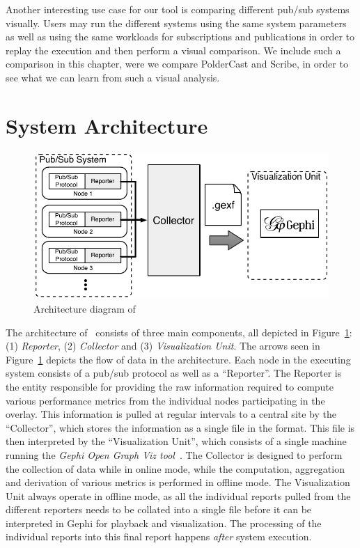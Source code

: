 Another interesting use case for our tool is comparing different pub/sub
systems visually. Users may run the different systems using the same
system parameters as well as using the same workloads for subscriptions
and publications in order to replay the execution and then perform a
visual comparison. We include such a comparison in this chapter, were we
compare PolderCast and Scribe, in order to see what we can learn from
such a visual analysis.

\section{System Architecture}
\label{sec:arch}

\begin{figure}[h]
\centering
\includegraphics[width=\linewidth]{figures/arch}
\caption{Architecture diagram of \demo}
\label{fig:arch}
\end{figure}

The architecture of \demo~consists of three main components, all
depicted in Figure~\ref{fig:arch}: (1) \emph{Reporter}, (2)
\emph{Collector} and (3) \emph{Visualization Unit}.  The arrows seen in
Figure~\ref{fig:arch} depicts the flow of data in the architecture.
Each node in the executing system consists of a pub/sub protocol as well
as a ``Reporter''. The Reporter is the entity responsible for providing
the raw information required to compute various performance metrics from
the individual nodes participating in the overlay. This information is
pulled at regular intervals to a central site by the ``Collector'',
which stores the information as a single file in the \gexf{} format.
This file is then interpreted by the ``Visualization Unit'', which
consists of a single machine running the \emph{Gephi Open Graph Viz
    tool}~\cite{ICWSM09154}. The Collector is designed to perform the
collection of data while in online mode, while the computation,
aggregation and derivation of various metrics is performed in offline
mode. The Visualization Unit always operate in offline mode, as all the
individual reports pulled from the different reporters needs to be
collated into a single \gexf{} file before it can be interpreted in Gephi
for playback and visualization. The processing of the individual reports
into this final report happens \emph{after} system execution.

